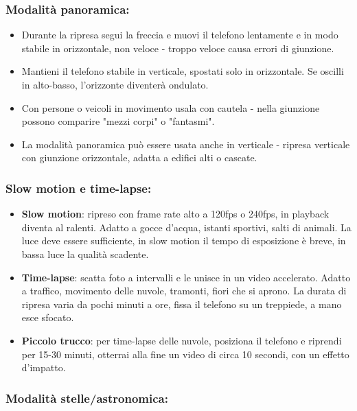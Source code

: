 \subsubsection*{Modalità panoramica:}

\begin{itemize}
  \item Durante la ripresa segui la freccia e muovi il telefono lentamente e in modo stabile in orizzontale, non veloce - troppo veloce causa errori di giunzione.
  \item Mantieni il telefono stabile in verticale, spostati solo in orizzontale. Se oscilli in alto-basso, l'orizzonte diventerà ondulato.
  \item Con persone o veicoli in movimento usala con cautela - nella giunzione possono comparire "mezzi corpi" o "fantasmi".
  \item La modalità panoramica può essere usata anche in verticale - ripresa verticale con giunzione orizzontale, adatta a edifici alti o cascate.
\end{itemize}

\subsubsection*{Slow motion e time-lapse:}

\begin{itemize}
  \item \textbf{Slow motion}: ripreso con frame rate alto a 120fps o 240fps, in playback diventa al ralenti. Adatto a gocce d'acqua, istanti sportivi, salti di animali. La luce deve essere sufficiente, in slow motion il tempo di esposizione è breve, in bassa luce la qualità scadente.
  \item \textbf{Time-lapse}: scatta foto a intervalli e le unisce in un video accelerato. Adatto a traffico, movimento delle nuvole, tramonti, fiori che si aprono. La durata di ripresa varia da pochi minuti a ore, fissa il telefono su un treppiede, a mano esce sfocato.
  \item \textbf{Piccolo trucco}: per time-lapse delle nuvole, posiziona il telefono e riprendi per 15-30 minuti, otterrai alla fine un video di circa 10 secondi, con un effetto d'impatto.
\end{itemize}

\subsubsection*{Modalità stelle/astronomica:}

